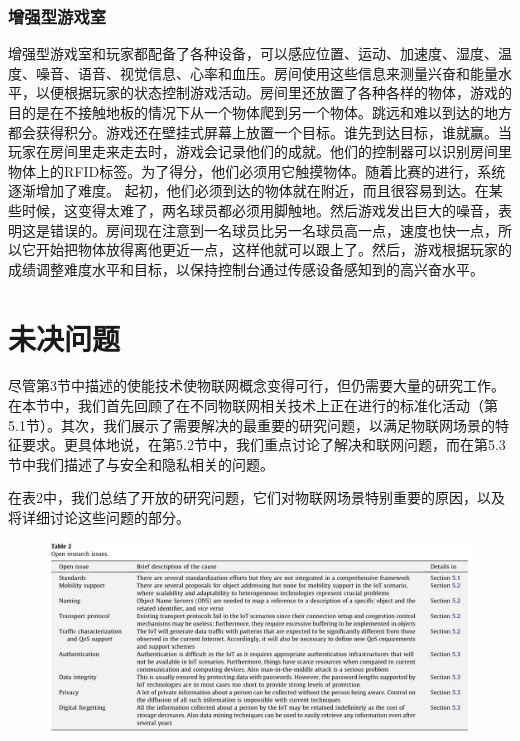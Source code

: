 \documentclass[12pt,a4paper]{article}%
\begin{document}
\subsubsection{增强型游戏室}
增强型游戏室和玩家都配备了各种设备，可以感应位置、运动、加速度、湿度、温度、噪音、语音、视觉信息、心率和血压。房间使用这些信息来测量兴奋和能量水平，以便根据玩家的状态控制游戏活动。房间里还放置了各种各样的物体，游戏的目的是在不接触地板的情况下从一个物体爬到另一个物体。跳远和难以到达的地方都会获得积分。游戏还在壁挂式屏幕上放置一个目标。谁先到达目标，谁就赢。当玩家在房间里走来走去时，游戏会记录他们的成就。他们的控制器可以识别房间里物体上的RFID标签。为了得分，他们必须用它触摸物体。随着比赛的进行，系统逐渐增加了难度。
起初，他们必须到达的物体就在附近，而且很容易到达。在某些时候，这变得太难了，两名球员都必须用脚触地。然后游戏发出巨大的噪音，表明这是错误的。房间现在注意到一名球员比另一名球员高一点，速度也快一点，所以它开始把物体放得离他更近一点，这样他就可以跟上了。然后，游戏根据玩家的成绩调整难度水平和目标，以保持控制台通过传感设备感知到的高兴奋水平。
\section{未决问题}
尽管第3节中描述的使能技术使物联网概念变得可行，但仍需要大量的研究工作。在本节中，我们首先回顾了在不同物联网相关技术上正在进行的标准化活动（第5.1节）。其次，我们展示了需要解决的最重要的研究问题，以满足物联网场景的特征要求。更具体地说，在第5.2节中，我们重点讨论了解决和联网问题，而在第5.3节中我们描述了与安全和隐私相关的问题。

在表2中，我们总结了开放的研究问题，它们对物联网场景特别重要的原因，以及将详细讨论这些问题的部分。

\begin{figure}[H]%
	\centering
	\begin{minipage}{1\textwidth}%
		\centering
		\includegraphics[width=1.0%
		\textwidth]{fig5.jpg}%
	\end{minipage}
\end{figure}
\end{document}
